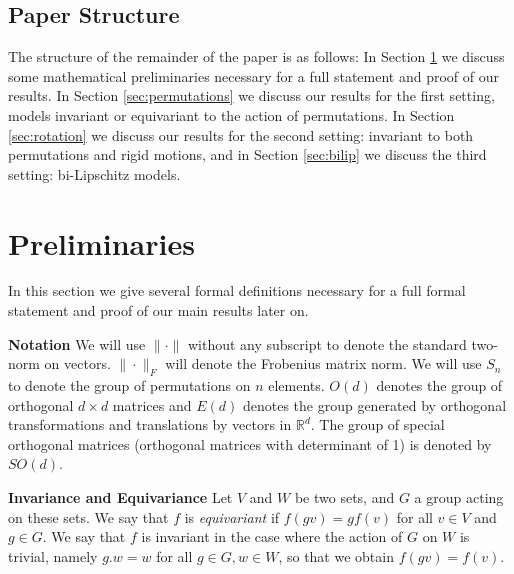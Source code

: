 \documentclass[twoside,11pt]{article}
\newcommand{\RR}{\mathbb{R}}
\begin{document}
\subsection{Paper Structure}
The structure of the remainder of the paper is as follows: In Section \ref{sec:prelim} we discuss some mathematical preliminaries necessary for a full statement and proof of our results. In Section \ref{sec:permutations} we discuss our results for the first setting, models invariant or equivariant to the action of permutations. In Section \ref{sec:rotation} we discuss our results for the second setting: invariant to both permutations and rigid motions, and in Section \ref{sec:bilip} we discuss the third setting: bi-Lipschitz models. 

\section{Preliminaries}\label{sec:prelim}
In this section we give several formal definitions necessary for a full formal statement and proof of our main results later on. 

\textbf{Notation}
We will use $\|\cdot \|$ without any subscript to denote the standard two-norm on vectors. $\|\cdot \|_F$ will denote the Frobenius matrix norm. 
We will use  $S_n$ to denote the group of permutations on $n$ elements. $O(d)$ denotes the group of orthogonal $d\times d$ matrices and $E(d)$ denotes the group generated by orthogonal transformations and translations by vectors in $\RR^d$.  The group of special orthogonal matrices (orthogonal matrices with determinant of 1) is denoted by $SO(d) $. 

\textbf{Invariance and Equivariance}
Let $V$ and $W$ be two sets, and $G$ a group acting on these sets. We say that $f$ is \emph{equivariant} if $f(gv)=gf(v) $ for all $v\in V$ and $g\in G$. We say that $f$ is invariant in the case where the action of $G$ on $W$ is trivial, namely $g.w=w$ for all $g\in G,w\in W$, so that we obtain $f(gv)=f(v)$.
\end{document}
